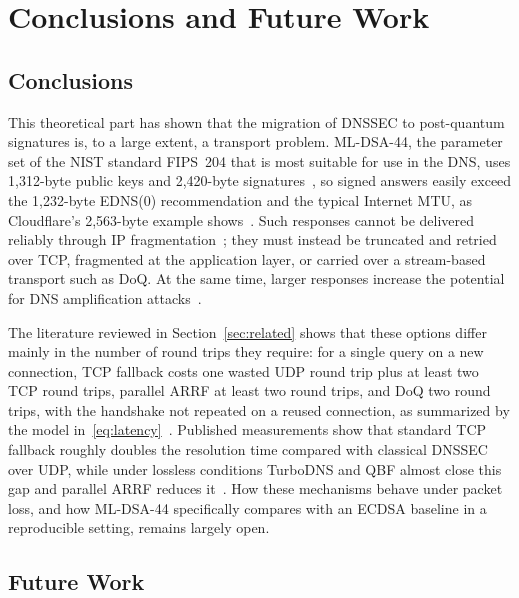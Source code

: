 \documentclass[conference]{IEEEtran}
\begin{document}
\section{Conclusions and Future Work}
\label{sec:conclusion}

\subsection{Conclusions}

This theoretical part has shown that the migration of DNSSEC to post-quantum
signatures is, to a large extent, a transport problem. ML-DSA-44, the parameter
set of the NIST standard FIPS~204 that is most suitable for use in the DNS,
uses 1,312-byte public keys and 2,420-byte signatures~\cite{fips204,mldsadraft},
so signed answers easily exceed the 1,232-byte EDNS(0) recommendation and the
typical Internet MTU, as Cloudflare's 2,563-byte example
shows~\cite{cloudflareblog}. Such responses cannot be delivered reliably
through IP fragmentation~\cite{fragpoison,dnssecrealworld,rfc9715}; they must
instead be truncated and retried over TCP, fragmented at the application
layer, or carried over a stream-based transport such as DoQ. At the same time,
larger responses increase the potential for DNS amplification
attacks~\cite{retrofitting,dnssecddos}.

The literature reviewed in Section~\ref{sec:related} shows that these options
differ mainly in the number of round trips they require: for a single query on
a new connection, TCP fallback costs one wasted UDP round trip plus at least
two TCP round trips, parallel ARRF at least two round trips, and DoQ two round
trips, with the handshake not repeated on a reused connection, as summarized
by the model in~\eqref{eq:latency}~\cite{rfc9250,turbodns,doqfirstlook}. Published
measurements show that standard TCP fallback roughly doubles the resolution
time compared with classical DNSSEC over UDP, while under lossless conditions
TurboDNS and QBF almost close this gap and parallel ARRF reduces
it~\cite{arrf,turbodns,qbf}. How these mechanisms behave under packet loss, and
how ML-DSA-44 specifically compares with an ECDSA baseline in a reproducible
setting, remains largely open.

\subsection{Future Work}
\end{document}

